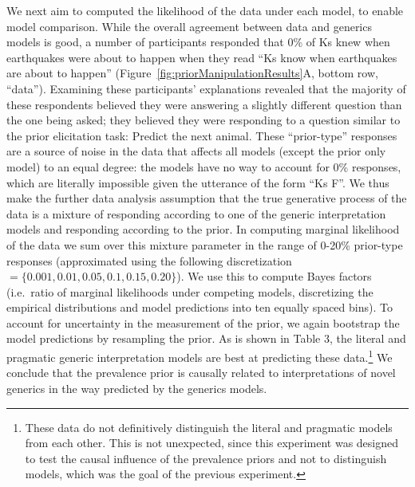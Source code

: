 \documentclass[floatsintext,doc]{apa6}
\let\rmarkdownfootnote\footnote%
\def\footnote{\protect\rmarkdownfootnote}
\newcommand{\mht}[1]{{\textcolor{Blue}{[mht: #1]}}}
\newcommand{\ndg}[1]{{\textcolor{Green}{[ndg: #1]}}}
\begin{document}
We next aim to computed the likelihood of the data under each model, to enable model comparison.
While the overall agreement between data and generics models is good, a number of participants responded that 0\% of Ks knew when earthquakes were about to happen when they read \enquote{Ks know when earthquakes are about to happen} (Figure~\ref{fig:priorManipulationResults}A, bottom row, \enquote{data}).
Examining these participants' explanations revealed that the majority of these respondents believed they were answering a slightly different question than the one being asked; they believed they were responding to a question similar to the prior elicitation task: Predict the next animal.
These \enquote{prior-type} responses are a source of noise in the data that affects all models (except the prior only model) to an equal degree: the models have no way to account for 0\% responses, which are literally impossible given the utterance of the form \enquote{Ks F}.
We thus make the further data analysis assumption that the true generative process of the data is a mixture of responding according to one of the generic interpretation models and responding according to the prior.
In computing marginal likelihood of the data we sum over this mixture parameter in the range of 0-20\% prior-type responses (approximated using the following discretization \(= \{0.001, 0.01, 0.05, 0.1, 0.15, 0.20\}\)).
We use this to compute Bayes factors (i.e.~ratio of marginal likelihoods under competing models, discretizing the empirical distributions and model predictions into ten equally spaced bins).
To account for uncertainty in the measurement of the prior, we again bootstrap the model predictions by resampling the prior.
As is shown in Table 3, the literal and pragmatic generic interpretation models are best at predicting these data.\footnote{These data do not definitively distinguish the literal and pragmatic models from each other. This is not unexpected, since this experiment was designed to test the causal influence of the prevalence priors and not to distinguish models, which was the goal of the previous experiment.}
We conclude that the prevalence prior is causally related to interpretations of novel generics in the way predicted by the generics models.
\end{document}
